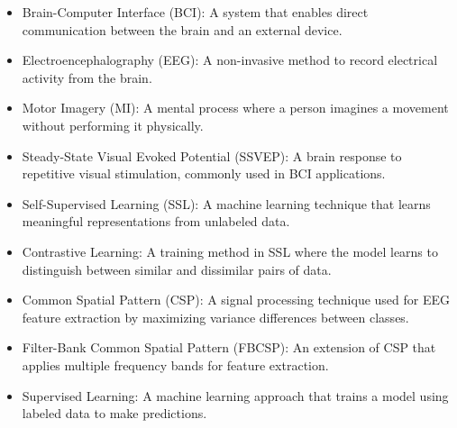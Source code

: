 \begin{itemize}
    \item Brain-Computer Interface (BCI): A system that enables direct communication between the brain and an external device.
    \item Electroencephalography (EEG): A non-invasive method to record electrical activity from the brain.
    \item Motor Imagery (MI): A mental process where a person imagines a movement without performing it physically.
    \item Steady-State Visual Evoked Potential (SSVEP): A brain response to repetitive visual stimulation, commonly used in BCI applications.
    \item Self-Supervised Learning (SSL): A machine learning technique that learns meaningful representations from unlabeled data.
    \item Contrastive Learning: A training method in SSL where the model learns to distinguish between similar and dissimilar pairs of data.
    \item Common Spatial Pattern (CSP): A signal processing technique used for EEG feature extraction by maximizing variance differences between classes.
    \item Filter-Bank Common Spatial Pattern (FBCSP): An extension of CSP that applies multiple frequency bands for feature extraction.
    \item Supervised Learning: A machine learning approach that trains a model using labeled data to make predictions.
\end{itemize}
